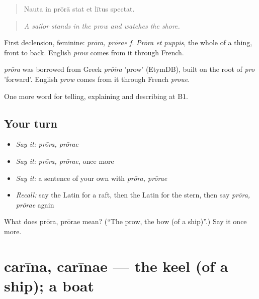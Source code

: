 \begin{quote}
Nauta in prōrā stat et lītus spectat.
\end{quote}

\begin{quote}
\emph{A sailor stands in the prow and watches the shore.}
\end{quote}

First declension, feminine: \emph{prōra, prōrae f.} \emph{Prōra et puppis}, the whole of a thing, front to back. English \emph{prow} comes from it through French.

\begin{cousinweb}
\emph{prōra} was borrowed from Greek \emph{prōira} 'prow' (EtymDB), built on the root of \emph{pro} 'forward'. English \emph{prow} comes from it through French \emph{proue}.
\end{cousinweb}

\begin{grammarlens}[title={What you've built}]
One more word for telling, explaining and describing at B1.
\end{grammarlens}

\subsection*{Your turn}
\begin{itemize}
\raggedright
  \item \emph{Say it:} \emph{prōra, prōrae}
  \item \emph{Say it:} \emph{prōra, prōrae}, once more
  \item \emph{Say it:} a sentence of your own with \emph{prōra, prōrae}
  \item \emph{Recall:} say the Latin for a raft, then the Latin for the stern, then say \emph{prōra, prōrae} again
\end{itemize}

\begin{tcolorbox}[breakable,colback=teal!4,colframe=teal!35!black,title={Before you move on}]
What does prōra, prōrae mean? (\textquotedblleft{}The prow, the bow (of a ship)\textquotedblright{}.) Say it once more.
\end{tcolorbox}
\section[carīna, carīnae]{carīna, carīnae — the keel (of a ship); a boat}

\label{lesson:LA-C436-carina}



